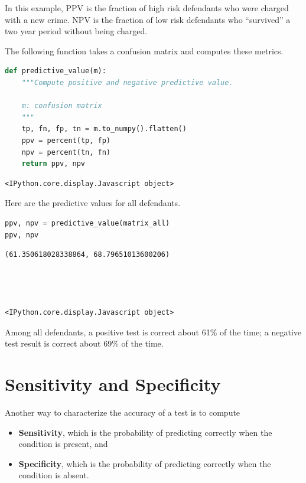 In this example, PPV is the fraction of high risk defendants who were
charged with a new crime. NPV is the fraction of low risk defendants who
``survived'' a two year period without being charged.

The following function takes a confusion matrix and computes these
metrics.

\begin{lstlisting}[language=Python,style=source]
def predictive_value(m):
    """Compute positive and negative predictive value.

    m: confusion matrix
    """
    tp, fn, fp, tn = m.to_numpy().flatten()
    ppv = percent(tp, fp)
    npv = percent(tn, fn)
    return ppv, npv
\end{lstlisting}

\begin{lstlisting}[style=output]
<IPython.core.display.Javascript object>
\end{lstlisting}

Here are the predictive values for all defendants.

\begin{lstlisting}[language=Python,style=source]
ppv, npv = predictive_value(matrix_all)
ppv, npv
\end{lstlisting}

\begin{lstlisting}[style=output]
(61.350618028338864, 68.79651013600206)




<IPython.core.display.Javascript object>
\end{lstlisting}

Among all defendants, a positive test is correct about 61\% of the time;
a negative test result is correct about 69\% of the time.

\hypertarget{sensitivity-and-specificity}{%
\section{Sensitivity and
Specificity}\label{sensitivity-and-specificity}}

Another way to characterize the accuracy of a test is to compute

\begin{itemize}
\item
  \textbf{Sensitivity}, which is the probability of predicting correctly
  when the condition is present, and
\item
  \textbf{Specificity}, which is the probability of predicting correctly
  when the condition is absent.
\end{itemize}

